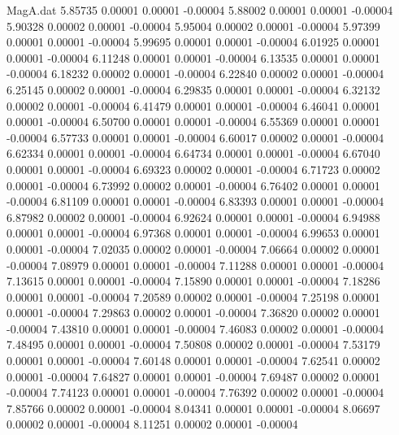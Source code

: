 \begin{filecontents}{MagA.dat}
   5.85735    0.00001    0.00001   -0.00004
   5.88002    0.00001    0.00001   -0.00004
   5.90328    0.00002    0.00001   -0.00004
   5.95004    0.00002    0.00001   -0.00004
   5.97399    0.00001    0.00001   -0.00004
   5.99695    0.00001    0.00001   -0.00004
   6.01925    0.00001    0.00001   -0.00004
   6.11248    0.00001    0.00001   -0.00004
   6.13535    0.00001    0.00001   -0.00004
   6.18232    0.00002    0.00001   -0.00004
   6.22840    0.00002    0.00001   -0.00004
   6.25145    0.00002    0.00001   -0.00004
   6.29835    0.00001    0.00001   -0.00004
   6.32132    0.00002    0.00001   -0.00004
   6.41479    0.00001    0.00001   -0.00004
   6.46041    0.00001    0.00001   -0.00004
   6.50700    0.00001    0.00001   -0.00004
   6.55369    0.00001    0.00001   -0.00004
   6.57733    0.00001    0.00001   -0.00004
   6.60017    0.00002    0.00001   -0.00004
   6.62334    0.00001    0.00001   -0.00004
   6.64734    0.00001    0.00001   -0.00004
   6.67040    0.00001    0.00001   -0.00004
   6.69323    0.00002    0.00001   -0.00004
   6.71723    0.00002    0.00001   -0.00004
   6.73992    0.00002    0.00001   -0.00004
   6.76402    0.00001    0.00001   -0.00004
   6.81109    0.00001    0.00001   -0.00004
   6.83393    0.00001    0.00001   -0.00004
   6.87982    0.00002    0.00001   -0.00004
   6.92624    0.00001    0.00001   -0.00004
   6.94988    0.00001    0.00001   -0.00004
   6.97368    0.00001    0.00001   -0.00004
   6.99653    0.00001    0.00001   -0.00004
   7.02035    0.00002    0.00001   -0.00004
   7.06664    0.00002    0.00001   -0.00004
   7.08979    0.00001    0.00001   -0.00004
   7.11288    0.00001    0.00001   -0.00004
   7.13615    0.00001    0.00001   -0.00004
   7.15890    0.00001    0.00001   -0.00004
   7.18286    0.00001    0.00001   -0.00004
   7.20589    0.00002    0.00001   -0.00004
   7.25198    0.00001    0.00001   -0.00004
   7.29863    0.00002    0.00001   -0.00004
   7.36820    0.00002    0.00001   -0.00004
   7.43810    0.00001    0.00001   -0.00004
   7.46083    0.00002    0.00001   -0.00004
   7.48495    0.00001    0.00001   -0.00004
   7.50808    0.00002    0.00001   -0.00004
   7.53179    0.00001    0.00001   -0.00004
   7.60148    0.00001    0.00001   -0.00004
   7.62541    0.00002    0.00001   -0.00004
   7.64827    0.00001    0.00001   -0.00004
   7.69487    0.00002    0.00001   -0.00004
   7.74123    0.00001    0.00001   -0.00004
   7.76392    0.00002    0.00001   -0.00004
   7.85766    0.00002    0.00001   -0.00004
   8.04341    0.00001    0.00001   -0.00004
   8.06697    0.00002    0.00001   -0.00004
   8.11251    0.00002    0.00001   -0.00004

\end{filecontents}
